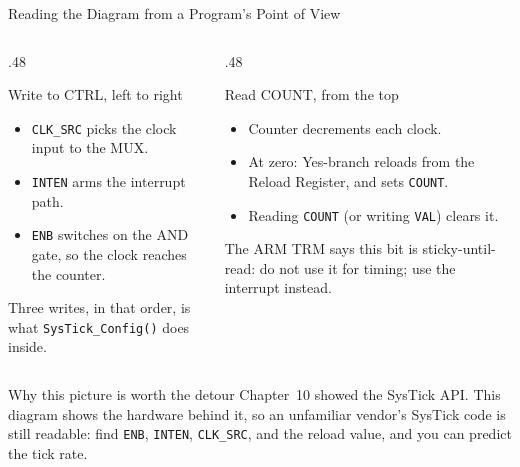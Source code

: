 \documentclass[9pt,aspectratio=169,xcolor=table]{beamer}
\begin{document}
{\beamerextras
\begin{frame}{Reading the Diagram from a Program's Point of View}
    \begin{columns}[T]
    \begin{column}{.48\textwidth}
        \begin{block}{Write to CTRL, left to right}
            {\small
            \begin{itemize}\itemsep1pt
                \item \texttt{CLK\_SRC} picks the clock input to the MUX.
                \item \texttt{INTEN} arms the interrupt path.
                \item \texttt{ENB} switches on the AND gate, so the clock
                      reaches the counter.
            \end{itemize}}
        \end{block}

        \vspace{2mm}
        {\small Three writes, in that order, is what \texttt{SysTick\_Config()}
        does inside.}
    \end{column}
    \begin{column}{.48\textwidth}
        \begin{block}{Read COUNT, from the top}
            {\small
            \begin{itemize}\itemsep1pt
                \item Counter decrements each clock.
                \item At zero: Yes-branch reloads from the Reload Register,
                      and sets \texttt{COUNT}.
                \item Reading \texttt{COUNT} (or writing \texttt{VAL})
                      clears it.
            \end{itemize}}
        \end{block}

        \vspace{2mm}
        {\small The ARM TRM says this bit is \alert{sticky-until-read}: do
        not use it for timing; use the interrupt instead.}
    \end{column}
    \end{columns}

    \vspace{3mm}
    \begin{block}{Why this picture is worth the detour}
        {\small Chapter~10 showed the SysTick API. This diagram shows the
        hardware behind it, so an unfamiliar vendor's SysTick code is
        still readable: find \texttt{ENB}, \texttt{INTEN},
        \texttt{CLK\_SRC}, and the reload value, and you can predict the
        tick rate.}
    \end{block}
\end{frame}
}
\end{document}
